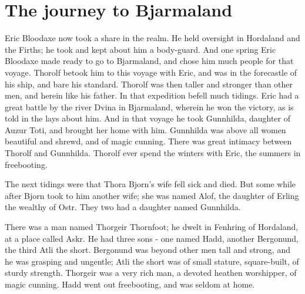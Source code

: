 \chapter{The journey to Bjarmaland}

Eric Bloodaxe now took a share in the realm. He held oversight in Hordaland and the Firths; he took and kept about him a body-guard. And one spring Eric Bloodaxe made ready to go to Bjarmaland, and chose him much people for that voyage. Thorolf betook him to this voyage with Eric, and was in the forecastle of his ship, and bare his standard. Thorolf was then taller and stronger than other men, and herein like his father. In that expedition befell much tidings. Eric had a great battle by the river Dvina in Bjarmaland, wherein he won the victory, as is told in the lays about him. And in that voyage he took Gunnhilda, daughter of Auzur Toti, and brought her home with him. Gunnhilda was above all women beautiful and shrewd, and of magic cunning. There was great intimacy between Thorolf and Gunnhilda. Thorolf ever spend the winters with Eric, the summers in freebooting.

The next tidings were that Thora Bjorn's wife fell sick and died. But some while after Bjorn took to him another wife; she was named Alof, the daughter of Erling the wealthy of Ostr. They two had a daughter named Gunnhilda.

There was a man named Thorgeir Thornfoot; he dwelt in Fenhring of Hordaland, at a place called Askr. He had three sons - one named Hadd, another Bergonund, the third Atli the short. Bergonund was beyond other men tall and strong, and he was grasping and ungentle; Atli the short was of small stature, square-built, of sturdy strength. Thorgeir was a very rich man, a devoted heathen worshipper, of magic cunning. Hadd went out freebooting, and was seldom at home.
